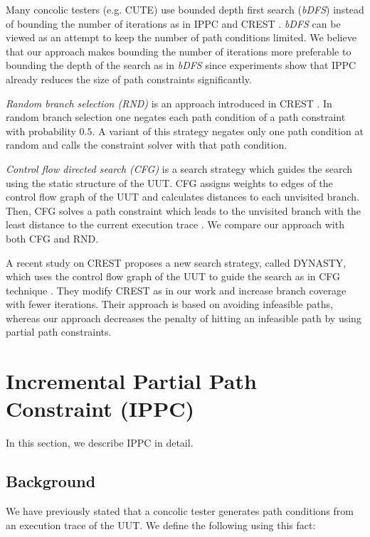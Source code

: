\documentclass[EPiCempty]{easychair}
\begin{document}
Many concolic testers (e.g. CUTE) use bounded depth first search (\emph{bDFS}) instead of bounding the number of iterations as in IPPC and CREST \cite{Sen:2005:CCU:1095430.1081750, Sen:2006:Thesis}. \emph{bDFS} can be viewed as an attempt to keep the number of path conditions limited. We believe that our approach makes bounding the number of iterations more preferable to bounding the depth of the search as in \emph{bDFS} since experiments show that IPPC already reduces the size of path constraints significantly.

\emph{Random branch selection (RND)} is an approach introduced in CREST \cite{Burnim:2008:HSD:1642931.1642995}. In random branch selection one negates each path condition of a path constraint with probability $0.5$. A variant of this strategy negates only one path condition at random and calls the constraint solver with that path condition.

\emph{Control flow directed search (CFG)} is a search strategy which guides the search using the static structure of the UUT. CFG assigns weights to edges of the control flow graph of the UUT and calculates distances to each unvisited branch. Then, CFG solves a path constraint which leads to the unvisited branch with the least distance to the current execution trace \cite{Burnim:2008:HSD:1642931.1642995}. We compare our approach with both CFG and RND.

A recent study on CREST proposes a new search strategy, called DYNASTY, which uses the control flow graph of the UUT to guide the search as in CFG technique \cite{Dong:2011:AHB:2056316.2057002}. They modify CREST as in our work and increase branch coverage with fewer iterations. Their approach is based on avoiding infeasible paths, whereas our approach decreases the penalty of hitting an infeasible path by using partial path constraints.

\section{Incremental Partial Path Constraint (IPPC)}
\label{sec:ppc}

In this section, we describe IPPC in detail. %

\subsection{Background}

We have previously stated that a concolic tester generates path conditions from an execution trace of the UUT. We define the following using this fact:
\end{document}
